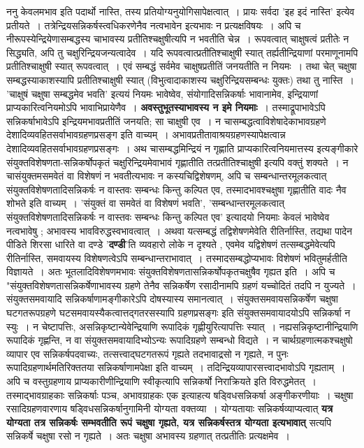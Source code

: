 {ननु केवलमभाव इति पदार्थो नास्ति, तस्य प्रतियोग्यनुयोगिसापेक्षत्वात्~। प्रायः सर्वदा 'इह इदं नास्ति' इत्येव प्रतीयते~। तत्रेन्द्रियसन्निकर्षस्त्वधिकरणेनैव नत्वभावेन इत्यभावः न प्रत्यक्षविषयः~। अपि च नीरूपस्येन्द्रियेणासम्बद्धस्य चाभावस्य प्रतीतिश्चक्षुषीत्यपि न भवतीति चेन्न~। रूपवत्वात् चाक्षुषत्वं प्रतीतेः न सिद्ध्यति, अपि तु चक्षुरिन्द्रियजन्यत्वादेव~। यदि रूपवत्वात्प्रतीतिश्चाक्षुषी स्यात् तर्ह्यतीन्द्रियाणां परमाणूनामपि प्रतीतिश्चाक्षुषी स्यात् रूपवत्वात्~। एवं सम्बद्धं सर्वमेव चाक्षुषप्रतीतिं जनयतीति न नियमः~। तथा चेत् चक्षुषा सम्बद्धस्याकाशस्यापि प्रतीतिश्चाक्षुषी स्यात् (विभुत्वादाकाशस्य चक्षुरिन्द्रियसम्बन्धः युक्तः) तथा तु नास्ति~। 'चाक्षुषं चक्षुषा सम्बद्धमेव भवति' इत्ययं नियमः भावेष्वेव, संयोगादिसन्निकर्षाः भावानामेव, इन्द्रियाणां प्राप्यकारित्वनियमोऽपि भावाभिप्रायेणैव~। \textbf{अवस्तुभूतस्याभावस्य न इमे नियमाः}~। तस्माद्रूपाभावेऽपि सन्निकर्षाभावेऽपि इन्द्रियमभावप्रतीतिं जनयति; सा चाक्षुषी एव~। न चासम्बद्धत्वाविशेषादेकाभावग्रहणे देशादिव्यवहितसर्वाभावग्रहणप्रसङ्‌ग इति वाच्यम्~। अभावप्रतीतावाश्रयग्रहणस्यापेक्षत्वान्न देशादिव्यवहितसर्वाभावग्रहणप्रसङ्गः~। अथ चासम्बद्धमिन्द्रियं न गृह्णाति प्राप्यकारित्वनियमात्तस्य इत्यङ्गीकारे संयुक्तविशेषणता-सन्निकर्षोपकृतं चक्षुरिन्द्रियमेवाभावं गृह्णातीति तत्प्रतीतिश्चाक्षुषी इत्यपि वक्तुं शक्यते~। न चासंयुक्तमसमवेतं वा विशेषणं न भवतीत्यभावः न कस्यचिद्विशेषणम्, अपि च सम्बन्धान्तरमूलकत्वात् संयुक्तविशेषणतादिसन्निकर्षः न वास्तवः सम्बन्धः किन्तु कल्पित एव, तस्मादभावश्चक्षुषा गृह्णातीति वादः नैव शोभते इति वाच्यम्~। 'संयुक्तं वा समवेतं वा विशेषणं भवति', 'सम्बन्धान्तरमूलकत्वात् संयुक्तविशेषणतादिसन्निकर्षः न वास्तवः सम्बन्धः किन्तु कल्पित एव' इत्यादयो नियमाः केवलं भावेष्वेव नत्वभावेषु ; अभावस्य भावविरुद्धस्वभावत्वात्~। अथवा यत्सम्बद्धं तद्विशेषणमेवेति रीतिर्नास्ति, तद्यथा पादेन पीडिते शिरसा धारिते वा दण्डे '\textbf{दण्डी}'ति व्यवहारो लोके न दृश्यते , एवमेव यद्विशेषणं तत्सम्बद्धमेवेत्यपि रीतिर्नास्ति, समवायस्य विशेषणत्वेऽपि सम्बन्धान्तराभावात्~। तस्मादसम्बद्धोप्यभावः विशेषणं भवितुमर्हतीति विज्ञायते~। अतः भूतलादिविशेषणमभावः संयुक्तविशेषणतासन्निकर्षोपकृतचक्षुषैव गृह्यत इति~। अपि च "संयुक्तविशेषणतासन्निकर्षेणाभावस्य ग्रहणे तेनैव सन्निकर्षेण रसादीनामपि ग्रहणं यच्चोदितं तदपि न युज्यते~। संयुक्तसमवायादि सन्निकर्षाणामङ्गीकारेऽपि दोषस्यास्य समानत्वात्~। संयुक्तसमवायसन्निकर्षेण चक्षुषा घटगतरूपग्रहणे घटसमवायस्यैकत्वात्तद्गतरसस्यापि ग्रहणप्रसङ्गः इति संयुक्तसमवायादयोऽपि सन्निकर्षा न स्युः~। न चेष्टापत्तिः, असन्निकृष्टान्येवेन्द्रियाणि रूपादिकं गृह्णीयुरित्यापत्तिः स्यात्~। नह्यसन्निकृष्टानीन्द्रियाणि रूपादिकं गृह्णन्ति, न वा संयुक्तसमवायादिभ्योऽन्यः रूपादिग्रहणे सम्बन्धो विद्यते~। न चार्थग्रहणात्मकश्चक्षुषो व्यापार एव सन्निकर्षपदवाच्यः, तत्सत्त्वाद्घटगतरूपं गृह्यते तदभावाद्रसो न गृह्यते, न पुनः रूपादिग्रहणार्थमतिरिक्ततया सन्निकर्षाणामपेक्षा इति वाच्यम्~। तदिन्द्रियव्यापारसत्त्वादभावोऽपि गृह्यताम्~। अपि च वस्तुग्रहणाय प्राप्यकारीणीन्द्रियाणि स्वीकृत्यापि सन्निकर्षो निराक्रियते इति विरुद्धमेतत्~। तस्माद्भावग्राहकाः सन्निकर्षाः पञ्च, अभावग्राहकः एक इत्याहत्य षड्विधसन्निकर्षा अङ्गीकरणीयाः~। चक्षुषा रसादिग्रहणवारणाय षड्विधसन्निकर्षानुगामिनी योग्यता वक्तव्या~। योग्यतायाः सन्निकर्षव्याप्यत्वात् \textbf{यत्र योग्यता तत्र सन्निकर्षः सम्भवतीति रूपं चक्षुषा गृह्यते, यत्र सन्निकर्षस्तत्र योग्यता इत्यभावात्} सत्यपि सन्निकर्षे चक्षुषा रसो न गृह्यते~। अतः चक्षुषा अभावस्य ग्रहणात् तत्प्रतीतिः प्रत्यक्षमेव~। 

}

